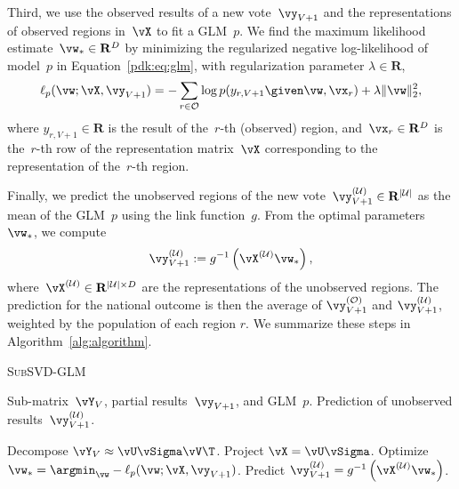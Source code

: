 Third, we use the observed results of a new vote~$\vy_{V+1}$ and the representations of observed regions in~$\vX$ to fit a GLM~$p$.
We find the maximum likelihood estimate~$\vw_* \in \mathbf{R}^D$ by minimizing the regularized negative log-likelihood of model~$p$ in Equation~\eqref{pdk:eq:glm}, with regularization parameter $\lambda \in \mathbf{R}$,
\begin{equation}
	\label{pdk:eq:log_likelihood}
	\ell_p(\vw ; \vX, \vy_{V+1}) = -\sum_{r \in \Obs} \log p(y_{r,V+1} \given \vw, \vx_r) + \lambda \| \vw \|_2^2,
\end{equation}
where $y_{r,V+1} \in \mathbf{R}$ is the result of the~$r$-th (observed) region, and~$\vx_r \in \mathbf{R}^D$ is the~$r$-th row of the representation matrix~$\vX$ corresponding to the representation of the~$r$-th region.

Finally, we predict the unobserved regions of the new vote~$\vy_{V+1}^{(\Ubs)} \in \mathbf{R}^{\vert \Ubs \vert}$ as the mean of the GLM~$p$ using the link function~$g$.
From the optimal parameters~$\vw_*$, we compute
\begin{equation}
	\label{pdk:eq:prediction}
	\vy^{(\Ubs)}_{V+1} := g^{-1}\left(\vX^{(\Ubs)} \vw_*\right),
\end{equation}
where~$\vX^{(\Ubs)} \in \mathbf{R}^{\vert \Ubs \vert \times D}$ are the representations of the unobserved regions.
The prediction for the national outcome is then the average of $\vy_{V+1}^{(\Obs)}$ and $\vy_{V+1}^{(\Ubs)}$, weighted by the population of each region $r$.
We summarize these steps in Algorithm~\ref{alg:algorithm}.

\begin{algorithm}
	\caption{\textsc{SubSVD-GLM}}
	\label{alg:algorithm}
	\begin{algorithmic}[1]
		\Input Sub-matrix~$\vY_V$, partial results~$\vy_{V+1}$, and GLM~$p$.
		\Output Prediction of unobserved results~$\vy_{V+1}^{(\Ubs)}$.

		\State Decompose $\vY_V \approx \vU \vSigma \vV\T$. 
		\State Project $\vX = \vU \vSigma$. 
		\State Optimize $\vw_* = \argmin_{\vw} -\ell_p(\vw ; \vX, \vy_{V+1})$. 
		\State Predict $\vy^{(\Ubs)}_{V+1} = g^{-1}\left(\vX^{(\Ubs)} \vw_*\right)$. 

	\end{algorithmic}
\end{algorithm}

